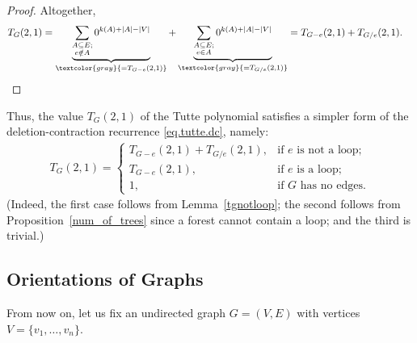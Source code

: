 \documentclass[12pt]{article}
\theoremstyle{definition}
\theoremstyle{remark}
\begin{document}
\begin{proof}
    Altogether, \begin{align*}
        T_{G}(2,1) &= \underbrace{\sum_{\substack{A \subseteq E; \\ e \notin A}}0^{k(A)+|A|-|V|}}_{\textcolor{gray}{=T_{G-e}(2,1)}}+\underbrace{\sum_{\substack{A \subseteq E; \\ e\in A}}0^{k(A)+|A|-|V|}}_{\textcolor{gray}{=T_{G/e}(2,1)}} = T_{G-e}(2,1)+T_{G/e}(2,1).
		\qedhere
    \end{align*}
\end{proof}

Thus, the value $T_G(2,1)$ of the Tutte polynomial satisfies a simpler form of the deletion-contraction recurrence \eqref{eq.tutte.dc}, namely:
\begin{align}
    T_{G}(2,1) = \begin{cases}
        T_{G-e}(2,1)+T_{G/e}(2,1), & \text{if $e$ is not a loop;} \\
        T_{G-e}(2,1), & \text{if $e$ is a loop}; \\
        1, & \text{if $G$ has no edges.}
    \end{cases}
    \label{eq.tutte21.dc}
\end{align}
(Indeed, the first case follows from Lemma~\ref{tgnotloop}; the second follows from Proposition~\ref{num_of_trees} since a forest cannot contain a loop; and the third is trivial.)

\subsection{Orientations of Graphs}

From now on, let us fix an undirected graph $G=(V,E)$ with vertices $V=\{v_1,\ldots,v_n\}$. 
\end{document}
